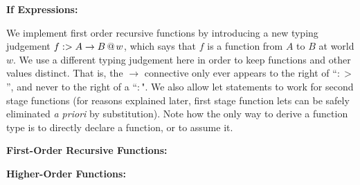 \documentclass[]{article}
\begin{document}
\begin{abstrsyn}
\begin{framed}
\noindent\textbf{If Expressions:}
\end{framed}

We implement first order recursive functions by introducing a new typing judgement \mbox{${f}:>{A\to B}~\hspace{-0.15em}\text{@}\hspace{-0.2em}~{w}$},
which says that $f$ is a function from $A$ to $B$ at world $w$.  
We use a different typing judgement here in order to keep functions and other values distinct.
That is, the $\to$ connective only ever appears to the right of ``$:>$'', and never to the right of a ``$:$".
We also allow let statements to work for second stage functions 
(for reasons explained later, first stage function lets can be safely eliminated \emph{a priori} by substitution).
Note how the only way to derive a function type is to directly declare a function, or to assume it.
\begin{framed}
\noindent\textbf{First-Order Recursive Functions:}
\end{framed}

\begin{framed}
\noindent\textbf{Higher-Order Functions:}
\end{framed}


\end{abstrsyn}
\end{document}

